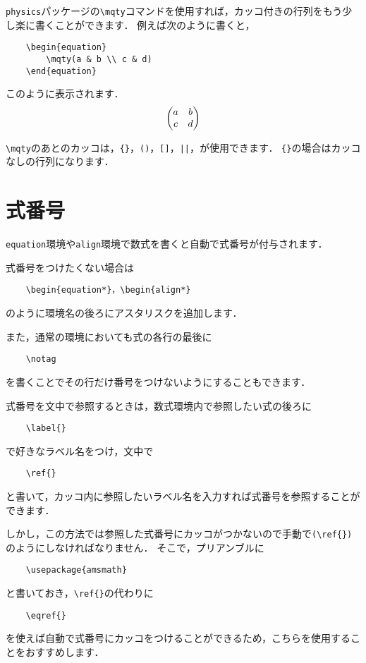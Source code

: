 \documentclass[a4paper,11pt]{ltjsreport}
\numberwithin{equation}{section}
\theoremstyle{definition}
\begin{document}
\verb|physics|パッケージの\verb|\mqty|コマンドを使用すれば，カッコ付きの行列をもう少し楽に書くことができます．
例えば次のように書くと，
\begin{verbatim}
    \begin{equation}
        \mqty(a & b \\ c & d)
    \end{equation}
\end{verbatim}
このように表示されます．
\begin{equation}
    \mqty(a & b \\ c & d)
\end{equation}

\verb|\mqty|のあとのカッコは，\verb|{}|，\verb|()|，\verb|[]|，\verb+||+，が使用できます\cite{physics}．
\verb|{}|の場合はカッコなしの行列になります．


\section{式番号}

\verb|equation|環境や\verb|align|環境で数式を書くと自動で式番号が付与されます．

式番号をつけたくない場合は
\begin{verbatim}
    \begin{equation*}，\begin{align*}
\end{verbatim}
のように環境名の後ろにアスタリスクを追加します．

また，通常の環境においても式の各行の最後に
\begin{verbatim}
    \notag
\end{verbatim}
を書くことでその行だけ番号をつけないようにすることもできます．

式番号を文中で参照するときは，数式環境内で参照したい式の後ろに
\begin{verbatim}
    \label{}
\end{verbatim}
で好きなラベル名をつけ，文中で
\begin{verbatim}
    \ref{}
\end{verbatim}
と書いて，カッコ内に参照したいラベル名を入力すれば式番号を参照することができます．

しかし，この方法では参照した式番号にカッコがつかないので手動で\verb|(\ref{})|のようにしなければなりません．
そこで，プリアンブルに
\begin{verbatim}
    \usepackage{amsmath}
\end{verbatim}
と書いておき，\verb|\ref{}|の代わりに
\begin{verbatim}
    \eqref{}
\end{verbatim}
を使えば自動で式番号にカッコをつけることができるため，こちらを使用することをおすすめします．
\end{document}

